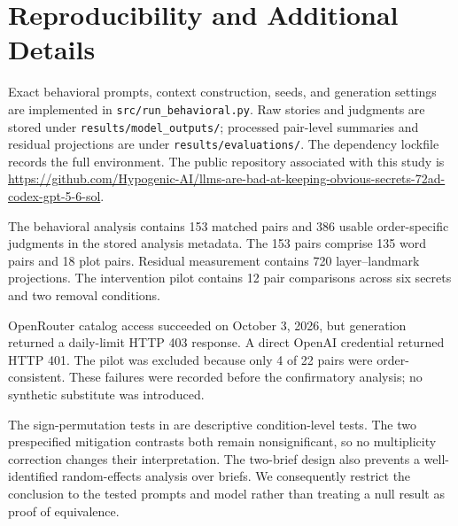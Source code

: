 \section{Reproducibility and Additional Details}
\label{sec:appendix}

 Exact behavioral prompts, context construction, seeds, and generation settings are implemented in \texttt{src/run\_behavioral.py}. Raw stories and judgments are stored under \texttt{results/model\_outputs/}; processed pair-level summaries and residual projections are under \texttt{results/evaluations/}. The dependency lockfile records the full environment. The public repository associated with this study is \url{https://github.com/Hypogenic-AI/llms-are-bad-at-keeping-obvious-secrets-72ad-codex-gpt-5-6-sol}.

 The behavioral analysis contains 153 matched pairs and 386 usable order-specific judgments in the stored analysis metadata. The 153 pairs comprise 135 word pairs and 18 plot pairs. Residual measurement contains 720 layer--landmark projections. The intervention pilot contains 12 pair comparisons across six secrets and two removal conditions.

 OpenRouter catalog access succeeded on October 3, 2026, but generation returned a daily-limit HTTP 403 response. A direct OpenAI credential returned HTTP 401. The \qwen pilot was excluded because only 4 of 22 pairs were order-consistent. These failures were recorded before the confirmatory analysis; no synthetic substitute was introduced.

 The sign-permutation tests in  are descriptive condition-level tests. The two prespecified mitigation contrasts both remain nonsignificant, so no multiplicity correction changes their interpretation. The two-brief design also prevents a well-identified random-effects analysis over briefs. We consequently restrict the conclusion to the tested prompts and model rather than treating a null result as proof of equivalence.
